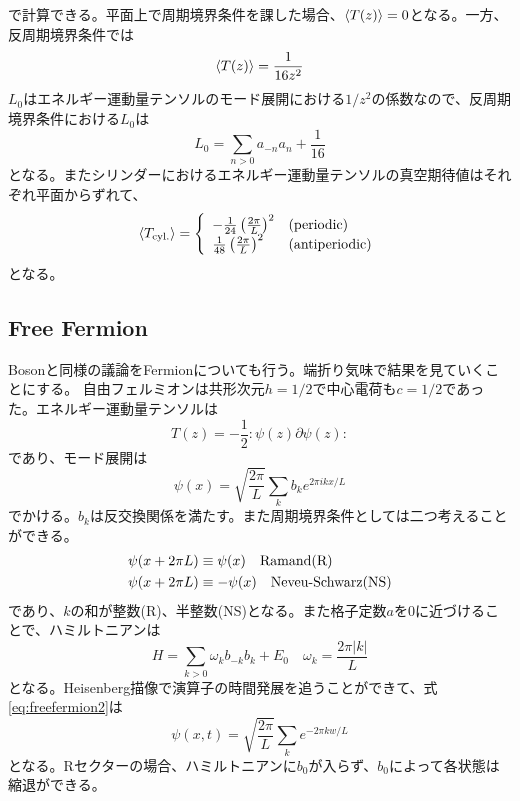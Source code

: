 \documentclass[11pt, aps, longbibliography]{article}
\numberwithin{equation}{section}
\begin{document}
        で計算できる。平面上で周期境界条件を課した場合、$\expval{T(z)} = 0$となる。一方、反周期境界条件では
        \begin{equation}\label{eq:freeboson4-6}
            \expval{T(z)} = \frac{1}{16z^2}
        \end{equation}
        $L_0$はエネルギー運動量テンソルのモード展開における$1/z^2$の係数なので、反周期境界条件における$L_0$は
        \begin{equation}\label{eq:freeboson4-7}
            L_0 = \sum_{n>0}a_{-n}a_n + \frac{1}{16}
        \end{equation}
        となる。またシリンダーにおけるエネルギー運動量テンソルの真空期待値はそれぞれ平面からずれて、
        \begin{equation}\label{eq:freeboson4-8}
            \expval{T_{\rm cyl.}} = \left\{\begin{array}{ll}
                -\frac{1}{24}\left( \frac{2\pi}{L} \right)^2 & (\text{periodic}) \\ \frac{1}{48}\left( \frac{2\pi}{L} \right)^2 & (\text{antiperiodic})
            \end{array}\right.
        \end{equation}
        となる。

    \subsection{Free Fermion}
        Bosonと同様の議論をFermionについても行う。端折り気味で結果を見ていくことにする。
        自由フェルミオンは共形次元$h=1/2$で中心電荷も$c=1/2$であった。エネルギー運動量テンソルは
        \begin{equation}\label{eq:freefermion1}
            T(z) = -\frac{1}{2}:\psi(z)\partial \psi(z):
        \end{equation}
        であり、モード展開は
        \begin{equation}\label{eq:freefermion2}
            \psi(x) = \sqrt{\frac{2\pi}{L}}\sum_{k}b_k e^{2\pi ikx/L}
        \end{equation}
        でかける。$b_k$は反交換関係を満たす。また周期境界条件としては二つ考えることができる。
        \begin{align}\label{eq:freefermion3}
            &\psi(x+2\pi L) \equiv \psi(x) \quad \text{Ramand(R)} \\
            &\psi(x+2\pi L) \equiv -\psi(x) \quad \text{Neveu-Schwarz(NS)} \notag
        \end{align}
        であり、$k$の和が整数(R)、半整数(NS)となる。また格子定数$a$を0に近づけることで、ハミルトニアンは
        \begin{equation}\label{eq:freefermion4}
            H = \sum_{k>0}\omega_k b_{-k}b_k + E_0 \quad \omega_k = \frac{2\pi|k|}{L}
        \end{equation}
        となる。Heisenberg描像で演算子の時間発展を追うことができて、式\eqref{eq:freefermion2}は
        \begin{equation}\label{eq:freefermion5}
            \psi(x,t) = \sqrt{\frac{2\pi}{L}}\sum_{k}e^{-2\pi kw/L}
        \end{equation}
        となる。Rセクターの場合、ハミルトニアンに$b_0$が入らず、$b_0$によって各状態は縮退ができる。
        
\end{document}
